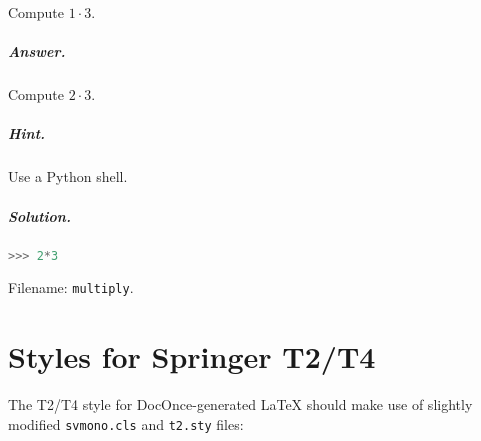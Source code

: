\documentclass[graybox,sectrefs,envcountresetchap,open=right,final]{svmonodo}
\makeatletter
\newenvironment{doconceexercise}{}{}
\newcounter{doconceexercisecounter}%
\newcommand\listofexercises{
\chapter*{List of Problems
          \@mkboth{List of Problems}{List of Problems}}
\markboth{List of Problems}{List of Problems}
\@starttoc{loe}
}
\makeatother
\begin{document}
\begin{doconceexercise}

                
\label{exer:mul}

Compute $1\cdot 3$.

\paragraph{Answer.}


Compute $2\cdot 3$.


\paragraph{Hint.}
Use a Python shell.


\paragraph{Solution.}



\begin{lstlisting}[language=Python,style=simple,xleftmargin=2mm]
>>> 2*3


\end{lstlisting}


\noindent Filename: \texttt{multiply}.

\end{doconceexercise}



\appendix

\chapter{Styles for Springer T2/T4}

The T2/T4 style for DocOnce-generated {\LaTeX} should make use of
slightly modified \texttt{svmono.cls} and \texttt{t2.sty} files:
\end{document}
